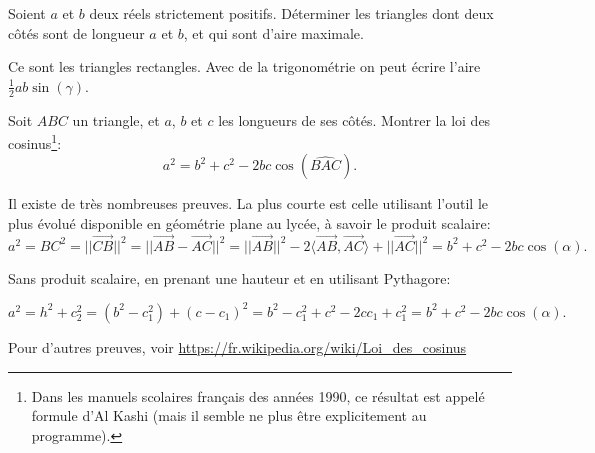 \begin{exo}
\label{deux_cotes_fixes}
Soient $a$ et $b$ deux réels strictement positifs. Déterminer les triangles dont deux côtés sont de longueur $a$ et $b$, et qui sont d'aire maximale.
\begin{sol}
Ce sont les triangles rectangles. Avec de la trigonométrie on peut écrire l'aire $\frac12 ab\sin(\gamma)$.
\end{sol}
\end{exo}

\begin{exo}
\label{Al_Kashi}
Soit $ABC$ un triangle, et $a$, $b$ et $c$ les longueurs de ses côtés. Montrer la \og loi des cosinus\footnote{Dans les manuels scolaires français des années 1990, ce résultat est appelé \og formule d'Al Kashi\fg{} (mais il semble ne plus être explicitement au programme).}\fg: 
\[ a^2=b^2+c^2-2bc\cos(\widehat{BAC}).\]


\begin{sol}
Il existe de très nombreuses preuves. La plus courte est celle utilisant l'outil le plus évolué disponible en géométrie plane au lycée, à savoir le produit scalaire:
\[ a^2 = BC^2=||\overrightarrow{CB}||^2 = ||\overrightarrow{AB} - \overrightarrow{AC}  ||^2 =||\overrightarrow{AB}||^2-2\langle \overrightarrow{AB},\overrightarrow{AC}\rangle+||\overrightarrow{AC}||^2= b^2+c^2 - 2bc \cos(\alpha).\]

Sans produit scalaire, en prenant une hauteur et en utilisant Pythagore:

\[  a^2 = h^2+c_2^2 = (b^2-c_1^2) + (c-c_1)^2 = b^2-c_1^2+c^2-2cc_1 +c_1^2=b^2+c^2 - 2bc\cos(\alpha).\]

Pour d'autres preuves, voir \url{https://fr.wikipedia.org/wiki/Loi_des_cosinus}
\end{sol}
\end{exo}


